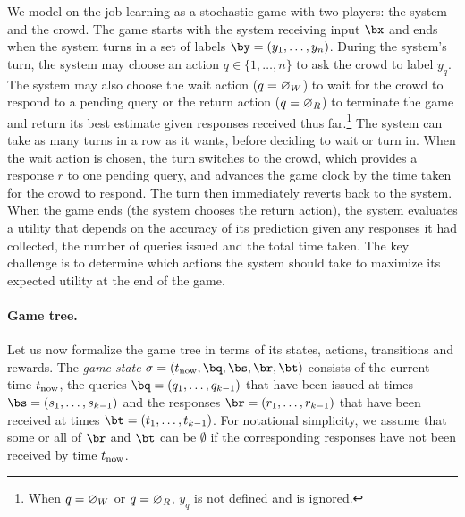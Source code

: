 

We model on-the-job learning as a stochastic game with two players: the system and the crowd.
The game starts with the system receiving input $\bx$ and ends when the system turns in a set of labels $\by = (y_1, \ldots, y_n)$. 
During the system's turn, the system may choose an action $q \in \{1, \ldots, n\}$ to ask the crowd to label $y_q$. 
The system may also choose 
the wait action ($q = \varnothing_{W}$) to wait for the crowd to respond to a pending query
or
the return action ($q = \varnothing_{R}$) to terminate the game and return its best estimate given responses received thus far.\footnote{When $q = \varnothing_{W}$ or $q = \varnothing_{R}$, $y_q$ is not defined and is ignored.}
The system can take as many turns in a row as it wants, before deciding to wait or turn in.
When the wait action is chosen, the turn switches to the crowd, which provides a response $r$ to one pending query, and advances the game clock by the time taken for the crowd to respond.
The turn then immediately reverts back to the system.
When the game ends (the system chooses the return action), the system evaluates a utility that depends on the accuracy of its prediction given any responses it had collected, the number of queries issued and the total time taken.
The key challenge is to determine which actions the system should take to maximize its expected utility at the end of the game.

\paragraph{Game tree.}
Let us now formalize the game tree in terms of its states, actions, transitions and rewards.
The \emph{game state} $\sigma = (\now, \bq, \bs, \br, \bt)$
consists of the current time $t_\text{now}$, the queries $\bq = (q_1, \ldots, q_{k-1})$ that have been issued at times $\bs = (s_1, \ldots, s_{k-1})$ and
the responses $\br = (r_1, \ldots, r_{k-1})$ that have been received at times $\bt = (t_1, \ldots, t_{k-1})$.
For notational simplicity, we assume that some or all of $\br$ and $\bt$ can be $\emptyset$ if the corresponding responses have not been received by time $t_\text{now}$.

